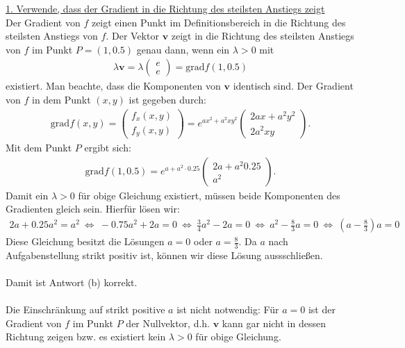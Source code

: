 \underline{1. Verwende, dass der Gradient in die Richtung des steilsten Anstiegs zeigt}\\
Der Gradient von $f$ zeigt einen Punkt im Definitionsbereich in die Richtung des steilsten Anstiegs von $f$.
Der Vektor $\mathbf{v}$ zeigt in die Richtung des steilsten Anstiegs von $f$ im Punkt $P = (1,0.5)$ genau dann, wenn ein $\lambda > 0 $ mit 
\begin{align*}
	\lambda\mathbf{v} 
	= \lambda 
	\begin{pmatrix}
		e \\ e
	\end{pmatrix}
	= \mathrm{grad} f(1,0.5)
\end{align*}
existiert. Man beachte, dass die Komponenten von $\mathbf{v}$ identisch sind. Der Gradient von $f$ in dem Punkt $(x,y)$ ist gegeben durch:
\begin{align*}
	\mathrm{grad} f(x,y)
	=
	\begin{pmatrix}
		f_x(x,y)\\
		f_y(x,y)
	\end{pmatrix}
	=
	e^{ax^2 +a^2 xy^2}
	\begin{pmatrix}
		2a x + a^2 y^2 \\
		2 a^2 xy
	\end{pmatrix}.
\end{align*}
Mit dem Punkt $P$ ergibt sich:
\begin{align*}
	\mathrm{grad} f(1,0.5)
	=
	e^{a+a^2\cdot 0.25}
	\begin{pmatrix}
		2a+a^2 0.25\\
		a^2
	\end{pmatrix}.
\end{align*}
Damit ein $\lambda > 0$ für obige Gleichung existiert, müssen beide Komponenten des Gradienten gleich sein. Hierfür lösen wir:
\begin{align*}
	2a + 0.25 a^2 = a^2 
	\ \Leftrightarrow \
	-0.75a^2 + 2a = 0
	\ \Leftrightarrow \
	\frac{3}{4} a^2 -2a = 0
	\ \Leftrightarrow \
	a^2 - \frac{8}{3} a = 0
	\ \Leftrightarrow \
	\left(a - \frac{8}{3}\right) a = 0
\end{align*}
Diese Gleichung besitzt die Lösungen $a= 0$ oder $a = \frac{8}{3}$. 
Da $a$ nach Aufgabenstellung strikt positiv ist, können wir diese Lösung aussschließen.\\
\\
Damit ist Antwort (b) korrekt.\\
\\
Die Einschränkung auf strikt positive $a$ ist nicht notwendig:
Für $a = 0$ ist der Gradient von $f$ im Punkt $P$ der Nullvektor, d.h. $\mathbf{v} $ kann gar nicht in dessen Richtung zeigen bzw. es existiert kein $\lambda > 0$ für obige Gleichung.



